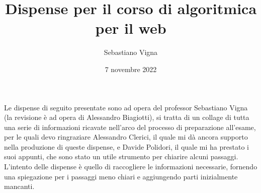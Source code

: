 \documentclass{article}
\title{
    Dispense per il corso di algoritmica per il web
}
\author{Sebastiano Vigna}
\date{7 novembre 2022}
\begin{document}
\maketitle
\clearpage
\tableofcontents
\clearpage
\noindent Le dispense di seguito presentate sono ad opera del professor Sebastiano Vigna (la revisione è ad opera di Alessandro Biagiotti), si tratta di un collage di tutta una serie di informazioni ricavate nell'arco del processo di preparazione all'esame, per le quali devo ringraziare Alessandro Clerici, il quale mi dà ancora supporto nella produzione di queste dispense, e Davide Polidori, il quale mi ha prestato i suoi appunti, che sono stato un utile strumento per chiarire alcuni passaggi. \\
L'intento delle dispense è quello di raccogliere le informazioni necessarie, fornendo una spiegazione per i passaggi meno chiari e aggiungendo parti inizialmente mancanti.










 


\end{document}
